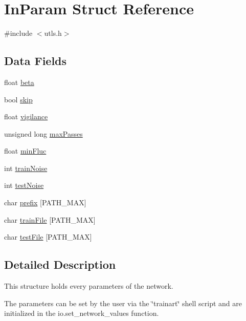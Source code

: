\hypertarget{struct_in_param}{\section{In\-Param Struct Reference}
\label{struct_in_param}
}


{\ttfamily \#include $<$utls.\-h$>$}

\subsection*{Data Fields}
\begin{DoxyCompactItemize}
\item 
float \hyperlink{struct_in_param_ab146b9cbab6e73e7588b240dc709fe01}{beta}
\item 
bool \hyperlink{struct_in_param_a84926deb45bc620f21afab303b9114c3}{skip}
\item 
float \hyperlink{struct_in_param_a785bde0eb3bff8f83bd6e019449f4a7d}{vigilance}
\item 
unsigned long \hyperlink{struct_in_param_aee3a18897dc672ba38e5a3a48b391bf5}{max\-Passes}
\item 
float \hyperlink{struct_in_param_a342fcb2317908701d8574b9c0e7c8bd1}{min\-Fluc}
\item 
int \hyperlink{struct_in_param_aac324529f6880073feb747dc3c6f7add}{train\-Noise}
\item 
int \hyperlink{struct_in_param_a38957505183ab4eba98c9ea699fa286e}{test\-Noise}
\item 
char \hyperlink{struct_in_param_a74f24df2ba8ea34ebc927809d25a14ef}{prefix} \mbox{[}P\-A\-T\-H\-\_\-\-M\-A\-X\mbox{]}
\item 
char \hyperlink{struct_in_param_adcd81017e33884084e72e477e5462f07}{train\-File} \mbox{[}P\-A\-T\-H\-\_\-\-M\-A\-X\mbox{]}
\item 
char \hyperlink{struct_in_param_ab064012679f686113e26114dd2a273f3}{test\-File} \mbox{[}P\-A\-T\-H\-\_\-\-M\-A\-X\mbox{]}
\end{DoxyCompactItemize}


\subsection{Detailed Description}
This structure holds every parameters of the network.

The parameters can be set by the user via the \char`\"{}trainart\char`\"{} shell script and are initialized in the io.\-set\-\_\-network\-\_\-values function. 


